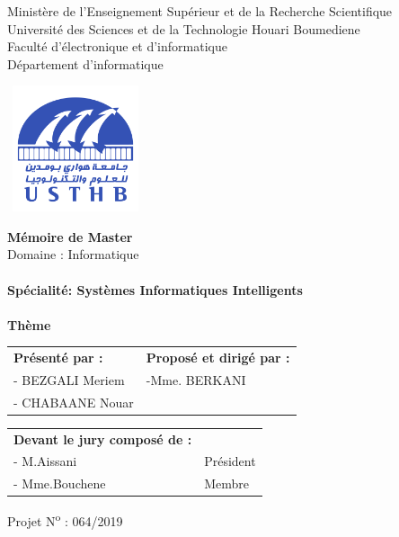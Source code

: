 \thispagestyle{empty}
\begin{center}
\normalsize{Ministère de l'Enseignement Supérieur et de la Recherche Scientifique}\\
\normalsize{Université des Sciences et de la Technologie Houari Boumediene}\\
\normalsize{Faculté d'électronique et d'informatique}\\
\normalsize{Département d'informatique}\\
\end{center}
\begin{center}
\includegraphics[width=4cm,height=3.7cm]{usthb.png}
\end{center}


\begin{center}
\Huge{\textbf{Mémoire de Master}}\\
\large{Domaine : Informatique}\\
\textbf{}\\
\large{\textbf{Spécialité: Systèmes Informatiques Intelligents}}\\
\textbf{}\\
\bigskip
\vspace*{0.5cm}
\normalsize{\textbf{Thème}}
\end{center}
\vspace*{1cm}

\begin{table}[h]
\center
\begin{tabular}{p{8cm}p{6.5cm}}
\textbf{Présenté par :} & \textbf{Proposé et dirigé par :}\\
- BEZGALI Meriem  & -Mme. BERKANI\\
- CHABAANE Nouar  
\end{tabular}
\end{table}

\begin{table}[h]
	\center
	\begin{tabular}{p{8cm}p{6.5cm}}
		\textbf{ Devant le jury composé de :} &\\
		- M.Aissani  & Président\\
		- Mme.Bouchene  & Membre\\
	\end{tabular}
\end{table}

\vspace*{0.5cm}

\begin{center}
Projet N\textsuperscript{o} : 064/2019
\end{center}


